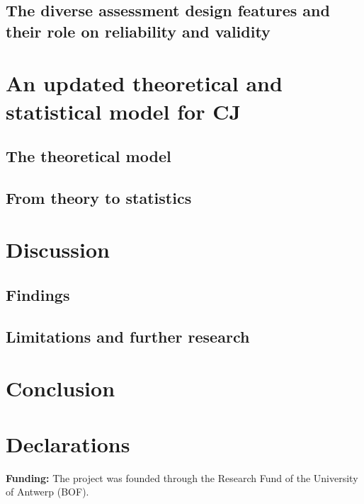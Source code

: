 \documentclass[
  authoryear,
  preprint,
  1p]{elsarticle}
\begin{document}
\subsection{The diverse assessment design features and their role on
reliability and validity}\label{sec-theory-issue3}

\section{An updated theoretical and statistical model for
CJ}\label{sec-theory}

\subsection{The theoretical model}\label{sec-theory-theoretical}

\subsection{From theory to statistics}\label{sec-theory-statistics}

\section{Discussion}\label{sec-discuss}

\subsection{Findings}\label{sec-discuss-finding}

\subsection{Limitations and further
research}\label{sec-discuss-limitations}

\section{Conclusion}\label{sec-conclusion}

\newpage{}

\section*{Declarations}\label{declarations}

\textbf{Funding:} The project was founded through the Research Fund of
the University of Antwerp (BOF).
\end{document}

